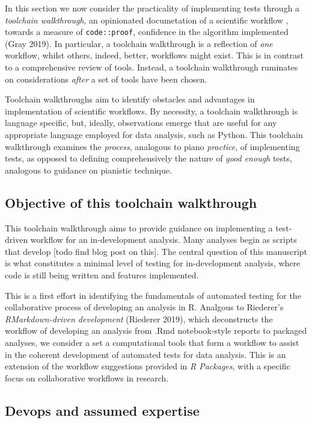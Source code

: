\documentclass[
]{article}
\begin{document}
In this section we now consider the practicality of implementing tests
through a \emph{toolchain walkthrough}, an opinionated documetation of a
scientific workflow , towards a measure of \texttt{code::proof},
confidence in the algorithm implemented (Gray 2019). In particular, a
toolchain walkthrough is a reflection of \emph{one} workflow, whilst
others, indeed, better, workflows might exist. This is in contrast to a
comprehensive review of tools. Instead, a toolchain walkthrough
ruminates on considerations \emph{after} a set of tools have been
chosen.

Toolchain walkthroughs aim to identify obstacles and advantages in
implementation of scientific workflows. By necessity, a toolchain
walkthrough is language specific, but, ideally, observations emerge that
are useful for any appropriate language employed for data analysis, such
as Python. This toolchain walkthrough examines the \emph{process},
analogous to piano \emph{practice}, of implementing tests, as opposed to
defining comprehensively the nature of \emph{good enough} tests,
analogous to guidance on pianistic technique.

\hypertarget{objective-of-this-toolchain-walkthrough}{%
\subsection{Objective of this toolchain
walkthrough}\label{objective-of-this-toolchain-walkthrough}}

This toolchain walkthrough aims to provide guidance on implementing a
test-driven workflow for an in-development analysis. Many analyses begin
as scripts that develop {[}todo find blog post on this{]}. The central
question of this manuscript is what constitutes a minimal level of
testing for in-development analysis, where code is still being written
and features implemented.

This is a first effort in identifying the fundamentals of automated
testing for the collaborative process of developing an analysis in R.
Analgous to Riederer's \emph{RMarkdown-driven development} (Riederer
2019), which deconstructs the workflow of developing an analysis from
.Rmd notebook-style reports to packaged analyses, we consider a set a
computational tools that form a workflow to assist in the coherent
development of automated tests for data analysis. This is an extension
of the workflow suggestions provided in \emph{R Packages}, with a
specific focus on collaborative workflows in research.

\hypertarget{devops-and-assumed-expertise}{%
\subsection{Devops and assumed
expertise}\label{devops-and-assumed-expertise}}
\end{document}
